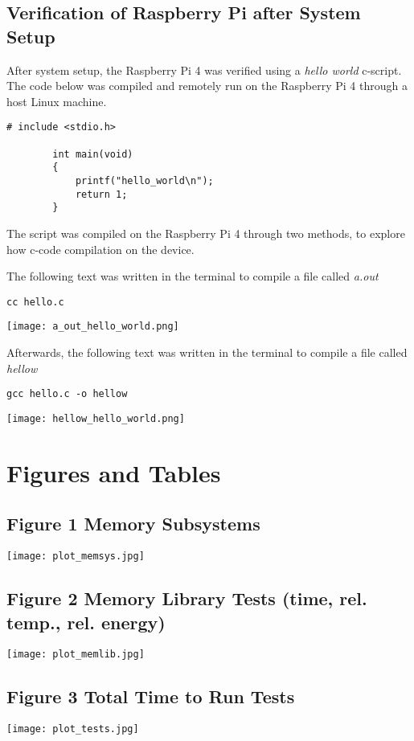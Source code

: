 \documentclass[journal]{IEEEtran}
\begin{document}
    \subsection{Verification of Raspberry Pi after System Setup}
    After system setup, the Raspberry Pi 4 was verified using a \emph{hello world} c-script. The code below was compiled and remotely run on the Raspberry Pi 4 through a host Linux machine.

    \begin{lstlisting}[frame=single]
        # include <stdio.h>

        int main(void)
        {
            printf("hello_world\n");
            return 1;
        }   
    \end{lstlisting}

    The script was compiled on the Raspberry Pi 4 through two methods, to explore how c-code compilation on the device. \newline

    The following text was written in the terminal to compile a file called \emph{a.out} \newline

    \begin{lstlisting}[frame=single]
        cc hello.c
    \end{lstlisting}

    \texttt{[image: a\_out\_hello\_world.png]}

    Afterwards, the following text was written in the terminal to compile a file called \emph{hellow} \newline

    \begin{lstlisting}[frame=single]
        gcc hello.c -o hellow
    \end{lstlisting}
    
    \texttt{[image: hellow\_hello\_world.png]}

    \section{Figures and Tables}
    \subsection{Figure 1 Memory Subsystems}

    \texttt{[image: plot\_memsys.jpg]}

    \subsection{Figure 2 Memory Library Tests (time, rel. temp., rel. energy)}

    \texttt{[image: plot\_memlib.jpg]}

    \subsection{Figure 3 Total Time to Run Tests}

    \texttt{[image: plot\_tests.jpg]}
\end{document}
